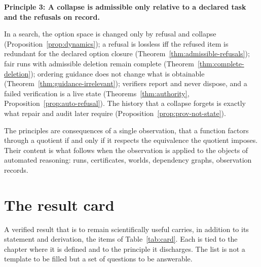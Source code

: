 \begin{principal}
\textbf{Principle 3: A collapse is admissible only relative to a declared task and the refusals on record.}

In a search, the option space is changed only by refusal and collapse (Proposition~\ref{prop:dynamics}); a refusal is lossless iff the refused item is redundant for the declared option closure (Theorem~\ref{thm:admissible-refusals}); fair runs with admissible deletion remain complete (Theorem~\ref{thm:complete-deletion}); ordering guidance does not change what is obtainable (Theorem~\ref{thm:guidance-irrelevant}); verifiers report and never dispose, and a failed verification is a live state (Theorems~\ref{thm:authority}, Proposition~\ref{prop:auto-refusal}). The history that a collapse forgets is exactly what repair and audit later require (Proposition~\ref{prop:prov-not-state}).
\end{principal}

The principles are consequences of a single observation, that a function factors through a quotient if and only if it respects the equivalence the quotient imposes. Their content is what follows when the observation is applied to the objects of automated reasoning: runs, certificates, worlds, dependency graphs, observation records.

\section{The result card}

A verified result that is to remain scientifically useful carries, in addition to its statement and derivation, the items of Table~\ref{tab:card}. Each is tied to the chapter where it is defined and to the principle it discharges. The list is not a template to be filled but a set of questions to be answerable.

